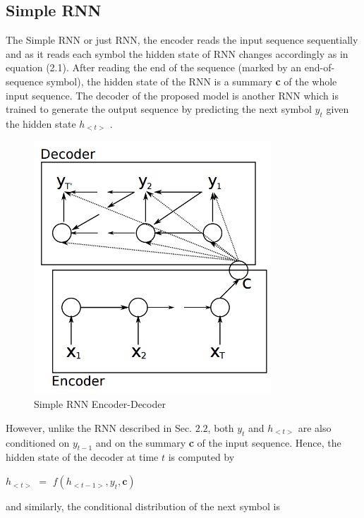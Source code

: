 \documentclass[12pt]{report}
\begin{document}
\subsection{Simple RNN}


The Simple RNN or just RNN, the encoder reads the input sequence sequentially and as it reads each symbol the hidden state of RNN changes accordingly as in equation (2.1). After reading the end of the sequence (marked by an end-of-sequence symbol),
the hidden state of the RNN is a summary \textbf{c} of the whole input sequence. The decoder of the proposed model is another
RNN which is trained to generate the output sequence
by predicting the next symbol $y_{t}$ given the
hidden state $h_{<t>}$
. 

\begin{figure}
\centering
\includegraphics[width=3.5in]{enc_dec.png}
\caption{Simple RNN Encoder-Decoder}
\label{enc_dec}
\end{figure}

However, unlike the RNN described
in Sec. $2.2$, both $y_{t}$ and $h_{<t>}$ are also conditioned
on $y_{t-1}$ and on the summary \textbf{c} of the input
sequence. Hence, the hidden state of the decoder
at time $t$ is computed by

\begin{center} $h_{<t>}$ $=$ $f \left( h_{<t-1>}, y_{t}, \textbf{c} \right)$
\end{center}

and similarly, the conditional distribution of the
next symbol is
\end{document}
